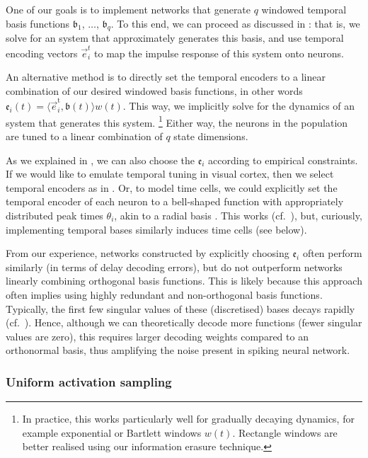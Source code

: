 One of our goals is to implement networks that generate $q$ windowed temporal basis functions $\mathfrak{b}_1$, $\ldots$, $\mathfrak{b}_q$.
To this end, we can proceed as discussed in : that is, we solve for an \LTI system that approximately generates this basis, and use temporal encoding vectors $\vec{e}^t_i$ to map the impulse response of this system onto neurons.

An alternative method is to directly set the temporal encoders to a linear combination of our desired windowed basis functions, in other words $\mathfrak{e}_i(t) = \langle \vec{e}^\mathrm{t}_i, \mathfrak{b}(t) \rangle  w(t)$.
This way, we implicitly solve for the dynamics of an \LTI system that generates this system.%
\footnote{In practice, this works particularly well for gradually decaying dynamics, for example exponential or Bartlett windows $w(t)$. Rectangle windows are better realised using our information erasure technique.}
Either way, the neurons in the population are tuned to a linear combination of $q$ state dimensions.

As we explained in , we can also choose the $\mathfrak{e}_i$ according to empirical constraints.
If we would like to emulate temporal tuning in visual cortex, then we select temporal encoders as in .
Or, to model time cells, we could explicitly set the temporal encoder of each neuron to a bell-shaped function with appropriately distributed peak times $\theta_i$, akin to a radial basis \citep{broomhead1988radial,stockel2020assorted}.
This works (cf.~), but, curiously, implementing temporal bases similarly induces time cells (see below).

From our experience, networks constructed by explicitly choosing $\mathfrak{e}_i$ often perform similarly (in terms of delay decoding errors), but do not outperform networks linearly combining orthogonal basis functions.
This is likely because this approach often implies using highly redundant and non-orthogonal basis functions.
Typically, the first few singular values of these (discretised) bases decays rapidly (cf.~).
Hence, although we can theoretically decode more functions (fewer singular values are zero), this requires larger decoding weights compared to an orthonormal basis, thus amplifying the noise present in spiking neural network.


\subsubsection{Uniform activation sampling}

